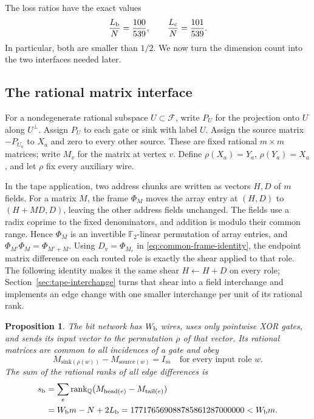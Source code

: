 \documentclass[11pt]{article}
\newtheorem{proposition}[theorem]{Proposition}
\theoremstyle{definition}
\begin{document}
The loss ratios have the exact values
\[
 \frac{L_{\rm b}}{N}=\frac{100}{539},\qquad
 \frac{L_{\rm c}}{N}=\frac{101}{539}.
\]
In particular, both are smaller than $1/2$.  We now turn the dimension
count into the two interfaces needed later.

\subsection{The rational matrix interface}

For a nondegenerate rational subspace $U\subset\mathcal F$, write
$P_U$ for the projection onto $U$ along $U^\perp$.  Assign $P_U$ to
each gate or sink with label $U$.  Assign the source matrix $-P_{U_a}$
to $X_a$ and zero to every other source.
These are fixed rational $m\times m$ matrices; write $M_v$ for the matrix
at vertex $v$.  Define
$\rho(X_a)=Y_a$, $\rho(Y_a)=X_a$, and let $\rho$ fix every auxiliary
wire.

In the tape application, two address chunks are written as vectors $H,D$
of $m$ fields.  For a matrix $M$, the frame $\Phi_M$ moves the array entry
at $(H,D)$ to $(H+MD,D)$, leaving the other address fields unchanged.
The fields use a radix coprime to the fixed denominators, and addition is
modulo their common range.  Hence $\Phi_M$ is an invertible
$\mathbb F_2$-linear permutation of array entries, and
$\Phi_{M'}\Phi_M=\Phi_{M'+M}$.  Using $D_v=\Phi_{M_v}$
in \eqref{eq:common-frame-identity}, the endpoint matrix difference on each
routed role is exactly the shear applied to that role.  The following identity
makes it the same shear $H\gets H+D$ on every role;
Section~\ref{sec:tape-interchange} turns that shear into a field interchange
and implements an edge change with one smaller interchange per unit of its
rational rank.

\begin{proposition}\label{prop:bit-motif-interface}
The bit network has $W_{\rm b}$ wires, uses only pointwise XOR gates,
and sends its input vector to the permutation $\rho$ of that vector.
Its rational matrices are common to all incidences of a gate and obey
\[
 M_{\mathrm{sink}(\rho(w))}-M_{\mathrm{source}(w)}=I_m
 \quad\text{for every input role }w.
\]
The sum of the rational ranks of all edge differences is
\begin{align}
 s_{\rm b}
 &=\sum_{e}\operatorname{rank}_{\mathbb Q}
      (M_{\mathrm{head}(e)}-M_{\mathrm{tail}(e)})\\
 &=W_{\rm b}m-N+2L_{\rm b}
  =177176569088785861287000000<W_{\rm b}m.
\end{align}
\end{proposition}
\end{document}
